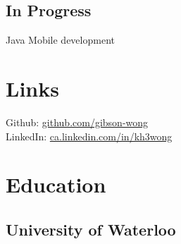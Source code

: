 \documentclass[letterpaper]{deedy-resume} %
\begin{document}
\begin{minipage}[t]{0.32\textwidth}
\subsection{In Progress}
Java \textbullet{} Mobile development
\sectionspace %


\section{Links} 

Github: \href{https://github.com/gibson-wong}{github.com/gibson-wong} \\
LinkedIn: \href{https://www.linkedin.com/in/kh3wong}{ca.linkedin.com/in/kh3wong} \\

\sectionspace %


\section{Education} 

\subsection{University of Waterloo}

\vspace{1mm}


\sectionspace %



\iffalse
\subsection{Earl Haig}
\subsection{Secondary School}
\vspace{1mm}
\location{Grad. June 2012 | Toronto, Ontario}
\sectionspace %
\fi


\end{minipage}
\end{document}

